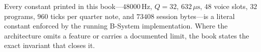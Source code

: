 Every constant printed in this book—$48000\,\text{Hz}$, $Q=32$, $632\,\mu\text{s}$, $48$ voice slots, $32$ programs, $960$ ticks per quarter note, and $73408$ session bytes—is a literal constant enforced by the running B-System implementation. Where the architecture omits a feature or carries a documented limit, the book states the exact invariant that closes it.
